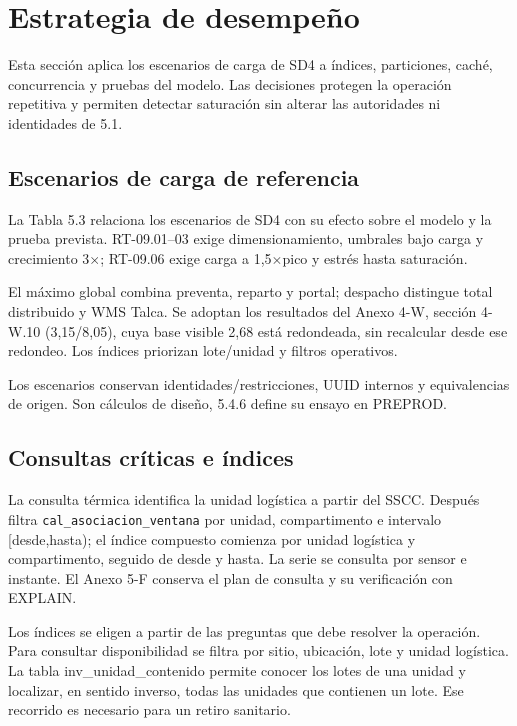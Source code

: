 \section{Estrategia de desempeño}
\label{sec:sd5-5-4}

Esta sección aplica los escenarios de carga de SD4 a índices, particiones, caché, concurrencia y pruebas del modelo. Las decisiones protegen la operación repetitiva y permiten detectar saturación sin alterar las autoridades ni identidades de 5.1.

\subsection{Escenarios de carga de referencia}
\label{sec:sd5-5-4-1}

La Tabla 5.3 relaciona los escenarios de SD4 con su efecto sobre el modelo y la prueba prevista. RT-09.01–03 exige dimensionamiento, umbrales bajo carga y crecimiento 3\ensuremath{\times}; RT-09.06 exige carga a 1,5\ensuremath{\times}pico y estrés hasta saturación.

El máximo global combina preventa, reparto y portal; despacho distingue total distribuido y WMS Talca. Se adoptan los resultados del Anexo 4-W, sección 4-W.10 (3,15/8,05), cuya base visible 2,68 está redondeada, sin recalcular desde ese redondeo. Los índices priorizan lote/unidad y filtros operativos.


Los escenarios conservan identidades/restricciones, UUID internos y equivalencias de origen. Son cálculos de diseño, 5.4.6 define su ensayo en PREPROD.

\subsection{Consultas críticas e índices}
\label{sec:sd5-5-4-2}

La consulta térmica identifica la unidad logística a partir del SSCC. Después filtra \texttt{cal\_\allowbreak{}asociacion\_\allowbreak{}ventana} por unidad, compartimento e intervalo [desde,hasta); el índice compuesto comienza por unidad logística y compartimento, seguido de desde y hasta. La serie se consulta por sensor e instante. El Anexo 5-F conserva el plan de consulta y su verificación con EXPLAIN.

Los índices se eligen a partir de las preguntas que debe resolver la operación. Para consultar disponibilidad se filtra por sitio, ubicación, lote y unidad logística. La tabla inv\_unidad\_contenido permite conocer los lotes de una unidad y localizar, en sentido inverso, todas las unidades que contienen un lote. Ese recorrido es necesario para un retiro sanitario.

